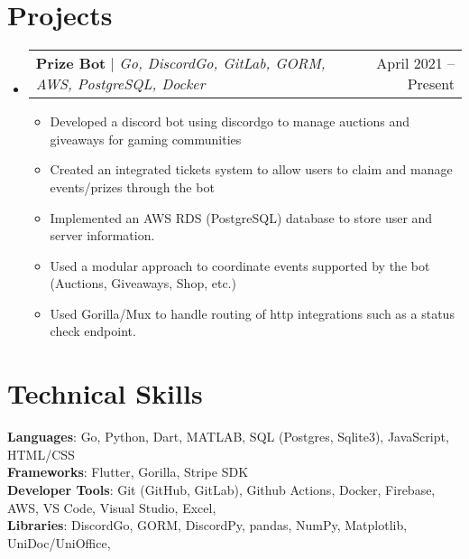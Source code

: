 \documentclass[letterpaper,11pt]{article}
\makeatletter
\newcommand{\resumeItem}[1]{
  \item\small{
    {#1 \vspace{-2pt}}
  }
}
\newcommand{\resumeProjectHeading}[2]{
    \item
    \begin{tabular*}{0.97\textwidth}{l@{\extracolsep{\fill}}r}
      \small#1 & #2 \\
    \end{tabular*}\vspace{-7pt}
}
\newcommand{\resumeSubHeadingListStart}{\begin{itemize}[leftmargin=0.15in, label={}]}
\newcommand{\resumeSubHeadingListEnd}{\end{itemize}}
\newcommand{\resumeItemListStart}{\begin{itemize}}
\newcommand{\resumeItemListEnd}{\end{itemize}\vspace{-5pt}}
\makeatother
\begin{document}
\section{Projects}
    \resumeSubHeadingListStart
      \resumeProjectHeading
          {\textbf{Prize Bot} $|$ \emph{Go, DiscordGo, GitLab, GORM, AWS, PostgreSQL, Docker}}{April 2021 -- Present}
          \resumeItemListStart
            \resumeItem{Developed a discord bot using discordgo to manage auctions and giveaways for gaming communities}
            \resumeItem{Created an integrated tickets system to allow users to claim and manage events/prizes through the bot}
            \resumeItem{Implemented an AWS RDS (PostgreSQL) database to store user and server information. }
            \resumeItem{Used a modular approach to coordinate events supported by the bot (Auctions, Giveaways, Shop, etc.)}
            \resumeItem{Used Gorilla/Mux to handle routing of http integrations such as a status check endpoint.}
          \resumeItemListEnd
      
    \resumeSubHeadingListEnd



%
\section{Technical Skills}
 \begin{itemize}[leftmargin=0.15in, label={}]
    \small{\item{
     \textbf{Languages}{: Go, Python, Dart, MATLAB, SQL (Postgres, Sqlite3), JavaScript, HTML/CSS} \\
     \textbf{Frameworks}{: Flutter, Gorilla, Stripe SDK} \\
     \textbf{Developer Tools}{: Git (GitHub, GitLab), Github Actions, Docker, Firebase, AWS, VS Code, Visual Studio, Excel,} \\
     \textbf{Libraries}{: DiscordGo, GORM, DiscordPy, pandas, NumPy, Matplotlib, UniDoc/UniOffice, } \\
    }}
 \end{itemize}


\end{document}

